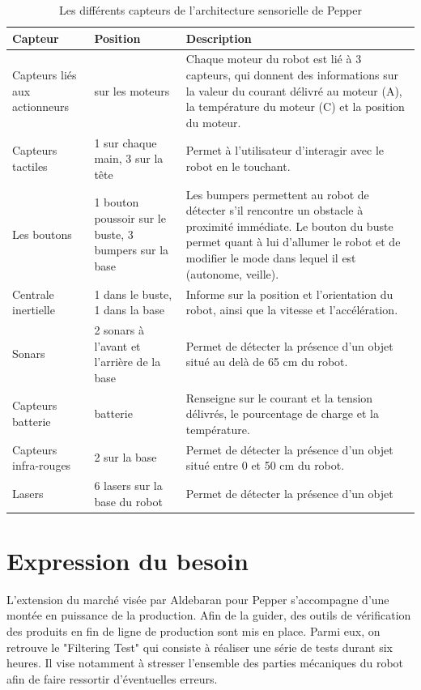 \begin{table}[h]
	\begin{tabular}{ | p{3cm} | p{4cm} | p{7cm} | }
		\hline
		Capteur & Position & Description \\
		\hline
		Capteurs liés aux actionneurs & sur les moteurs & Chaque moteur du robot est lié à 3 capteurs, qui donnent des informations sur la valeur du courant délivré au moteur (A), la température du moteur (\degres C) et la position du moteur. \\
		\hline
		Capteurs tactiles & 1 sur chaque main, 3 sur la tête & Permet à l'utilisateur d'interagir avec le robot en le touchant.	\\	
		\hline 
		Les boutons & 1 bouton poussoir sur le buste, 3 bumpers sur la base & Les bumpers permettent au robot de détecter s'il rencontre un obstacle à proximité immédiate. Le bouton du buste permet quant à lui d'allumer le robot et de modifier le mode dans lequel il est (autonome, veille). \\
		\hline 
		Centrale inertielle & 1 dans le buste, 1 dans la base & Informe sur la position et l'orientation du robot, ainsi que la vitesse et l'accélération. \\
		\hline
		Sonars & 2 sonars à l'avant et l'arrière de la base & Permet de détecter la présence d'un objet situé au delà de 65 cm du robot. \\
		\hline 
		Capteurs batterie & batterie & Renseigne sur le courant et la tension délivrés, le pourcentage de charge et la température. \\
		\hline
		Capteurs infra-rouges & 2 sur la base &  Permet de détecter la présence d'un objet situé entre 0 et 50 cm du robot. \\
		\hline
		Lasers & 6 lasers sur la base du robot & Permet de détecter la présence d'un objet \\
		\hline 
	\end{tabular}
	\caption[Les différents capteurs de Pepper]{Les différents capteurs de l'architecture sensorielle de Pepper}
	\label {tab: Les différents capteurs de Pepper}
\end{table}


\section{Expression du besoin}
\label{Introduction:Expression du besoin}
L'extension du marché visée par Aldebaran pour Pepper s'accompagne d'une montée en puissance de la production. Afin de la guider, des outils de vérification des produits en fin de ligne de production sont mis en place. Parmi eux, on retrouve le "Filtering Test" qui consiste à réaliser une série de tests durant six heures. Il vise notamment à stresser l'ensemble des parties mécaniques du robot afin de faire ressortir d'éventuelles erreurs.

